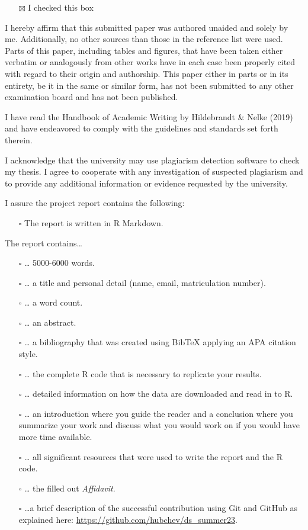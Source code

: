 \documentclass[
  12pt,
]{article}
\providecommand{\tightlist}{%
  \setlength{\itemsep}{0pt}\setlength{\parskip}{0pt}}
\begin{document}
\begin{itemize}
\tightlist
\item[$\boxtimes$]
  I checked this box
\end{itemize}

I hereby affirm that this submitted paper was authored unaided and
solely by me. Additionally, no other sources than those in the reference
list were used. Parts of this paper, including tables and figures, that
have been taken either verbatim or analogously from other works have in
each case been properly cited with regard to their origin and
authorship. This paper either in parts or in its entirety, be it in the
same or similar form, has not been submitted to any other examination
board and has not been published.

I have read the Handbook of Academic Writing by Hildebrandt \& Nelke (2019) and
have endeavored to comply with the guidelines and standards set forth
therein.

I acknowledge that the university may use plagiarism detection software
to check my thesis. I agree to cooperate with any investigation of
suspected plagiarism and to provide any additional information or
evidence requested by the university.

I assure the project report contains the following:

\begin{itemize}
\tightlist
\item[$\square$]
  The report is written in R Markdown.
\end{itemize}

The report contains\ldots{}

\begin{itemize}
\item[$\square$]
  \ldots{} 5000-6000 words.
\item[$\square$]
  \ldots{} a title and personal detail (name, email, matriculation
  number).
\item[$\square$]
  \ldots{} a word count.
\item[$\square$]
  \ldots{} an abstract.
\item[$\square$]
  \ldots{} a bibliography that was created using BibTeX applying an APA
  citation style.
\item[$\square$]
  \ldots{} the complete R code that is necessary to replicate your
  results.
\item[$\square$]
  \ldots{} detailed information on how the data are downloaded and read
  in to R.
\item[$\square$]
  \ldots{} an introduction where you guide the reader and a conclusion
  where you summarize your work and discuss what you would work on if
  you would have more time available.
\item[$\square$]
  \ldots{} all significant resources that were used to write the report
  and the R code.
\item[$\square$]
  \ldots{} the filled out \emph{Affidavit}.
\item[$\square$]
  \ldots a brief description of the successful contribution using Git and GitHub as explained here: \url{https://github.com/hubchev/ds_summer23}.
\end{itemize}
\end{document}

